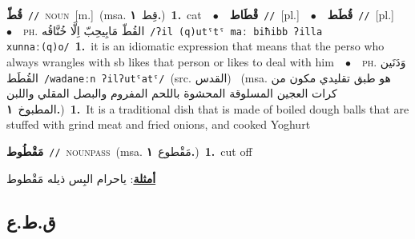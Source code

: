 \documentclass[10pt,a4paper,twoside]{article} %
\begin{document}
\begin{multicols}{2}
{\setlength\topsep{0pt}\textbf{\foreignlanguage{arabic}{قُطّ}}\ {\color{gray}\texttt{//}\color{black}}\ \textsc{noun}\ [m.]\ \color{gray}(msa. \foreignlanguage{arabic}{قِط}~\foreignlanguage{arabic}{\textbf{١.}})\color{black}\ \textbf{1.}~cat\ \ $\bullet$\ \ \setlength\topsep{0pt}\textbf{\foreignlanguage{arabic}{قْطَاط}}\ {\color{gray}\texttt{//}\color{black}}\ [pl.]\ \ $\bullet$\ \ \setlength\topsep{0pt}\textbf{\foreignlanguage{arabic}{قُطَط}}\ {\color{gray}\texttt{//}\color{black}}\ [pl.]\ \ $\bullet$\ \ \textsc{ph.} \color{gray} \foreignlanguage{arabic}{القُطّ مَابِيحِبّ اِلَّا خُنَّاقُه}\color{black}\ {\color{gray}\texttt{/{\sffamily ʔil (q)utˤtˤ maː biħibb ʔilla xunnaː(q)o}/}\color{black}}\ \textbf{1.}~it is an idiomatic expression that means that the perso who always wrangles with sb likes that person or likes to deal with him\ \ $\bullet$\ \ \textsc{ph.} \color{gray} \foreignlanguage{arabic}{وَدَنَين القُطَط}\color{black}\ {\color{gray}\texttt{/{\sffamily wadaneːn ʔilʔutˤatˤ}/}\color{black}}\ \color{gray}(src. \foreignlanguage{arabic}{القدس})\color{black}\ \color{gray} (msa. \foreignlanguage{arabic}{هو طبق تقليدي مكون من كرات العجين المسلوقة المحشوة باللحم المفروم والبصل المقلي واللبن المطبوخ}~\foreignlanguage{arabic}{\textbf{١.}})\color{black}\ \textbf{1.}~It is a traditional dish that is made of boiled dough balls that are stuffed with grind meat and fried onions, and cooked Yoghurt\ } \vspace{2mm}

{\setlength\topsep{0pt}\textbf{\foreignlanguage{arabic}{مَقْطُوط}}\ {\color{gray}\texttt{//}\color{black}}\ \textsc{noun\textunderscore pass}\ \color{gray}(msa. \foreignlanguage{arabic}{مَقْطوع}~\foreignlanguage{arabic}{\textbf{١.}})\color{black}\ \textbf{1.}~cut off\  \begin{flushright}\color{gray}\foreignlanguage{arabic}{\textbf{\underline{\foreignlanguage{arabic}{أمثلة}}}: ياحرام البِس ذيله مَقْطوط}\end{flushright}\color{black}} \vspace{2mm}

\vspace{-3mm}
\subsection*{\color{blue}\foreignlanguage{arabic}{ق.ط.ع}\color{blue}{}} 


\end{multicols}
\end{document}
